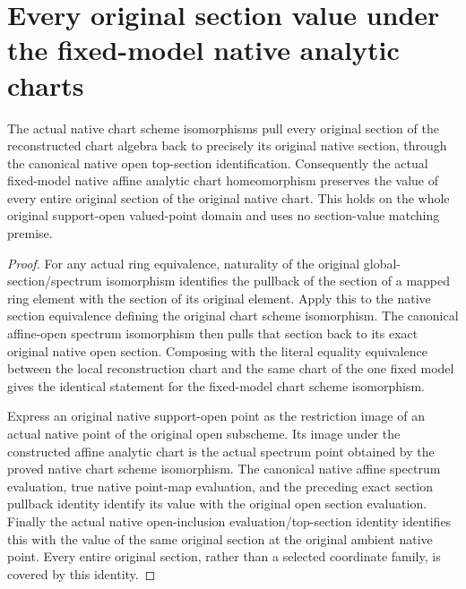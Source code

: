 \section{Every original section value under the fixed-model native analytic charts}
\label{sec:projective-fixed-native-analytic-values}

\begin{theorem}
\label{thm:projective-fixed-native-analytic-values}
\leanok
{}
The actual native chart scheme isomorphisms pull every original section
of the reconstructed chart algebra back to precisely its original
native section, through the canonical native open top-section
identification. Consequently the actual fixed-model native affine
analytic chart homeomorphism preserves the value of every entire
original section of the original native chart. This holds on the whole
original support-open valued-point domain and uses no section-value
matching premise.
\end{theorem}
\begin{proof}
For any actual ring equivalence, naturality of the original
global-section/spectrum isomorphism identifies the pullback of the
section of a mapped ring element with the section of its original
element. Apply this to the native section equivalence defining the
original chart scheme isomorphism. The canonical affine-open spectrum
isomorphism then pulls that section back to its exact original native
open section. Composing with the literal equality equivalence between
the local reconstruction chart and the same chart of the one fixed
model gives the identical statement for the fixed-model chart scheme
isomorphism.

Express an original native support-open point as the restriction image
of an actual native point of the original open subscheme. Its image
under the constructed affine analytic chart is the actual spectrum
point obtained by the proved native chart scheme isomorphism. The
canonical native affine spectrum evaluation, true native point-map
evaluation, and the preceding exact section pullback identity identify
its value with the original open section evaluation. Finally the actual
native open-inclusion evaluation/top-section identity identifies this
with the value of the same original section at the original ambient
native point. Every entire original section, rather than a selected
coordinate family, is covered by this identity.
\end{proof}
